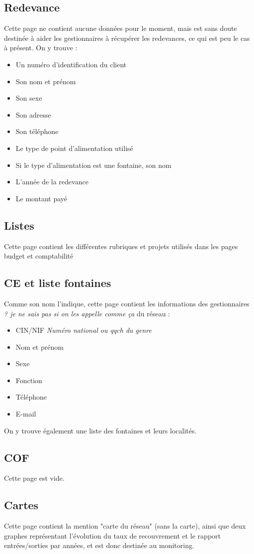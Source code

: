 \documentclass[a4paper, 11pt]{article}
\begin{document}
\subsection{Redevance}
Cette page ne contient aucune données pour le moment, mais est sans doute destinée à aider les gestionnaires à récupérer les redevances, ce qui est peu le cas à présent. On y trouve :

\begin{itemize}
        \item Un numéro d'identification du client
        \item Son nom et prénom
        \item Son sexe
        \item Son adresse
        \item Son téléphone
        \item Le type de point d'alimentation utilisé
        \item Si le type d'alimentation est une fontaine, son nom
        \item L'année de la redevance
        \item Le montant payé
    \end{itemize}
    
\subsection{Listes}
Cette page contient les différentes rubriques et projets utilisés dans les pages budget et comptabilité

\subsection{CE et liste fontaines}
Comme son nom l'indique, cette page contient les informations des gestionnaires \emph{? je ne sais pas si on les appelle comme ça} du réseau :

\begin{itemize}
    \item CIN/NIF \emph{Numéro national ou qqch du genre}
    \item Nom et prénom
    \item Sexe
    \item Fonction
    \item Téléphone
    \item E-mail
\end{itemize}

On y trouve également une liste des fontaines et leurs localités.

\subsection{COF}
Cette page est vide.

\subsection{Cartes}
Cette page contient la mention "carte du réseau" (sans la carte), ainsi que deux graphes représentant l'évolution du taux de recouvrement et le rapport entrées/sorties par années, et est donc destinée au monitoring.
\end{document}
